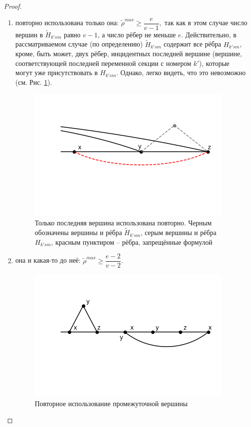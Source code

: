 \begin{proof}
\begin{enumerate}
\begin{enumerate}
\item 
повторно использована только она: $\tilde \rho^{max} \geq \dfrac{e}{v-1},$ 
так как в этом случае число вершин в $\tilde H_{k'sm}$ равно $v-1$, а число рёбер не меньше $e$. Действительно, в рассматриваемом случае (по определению) $\tilde H_{k'sm}$ содержит все рёбра $H_{k'sm}$, кроме, быть может, двух рёбер, инцидентных последней вершине (вершине, соответствующей последней переменной секции с номером $k'$), которые могут уже присутствовать в $H_{k'sm}$.
Однако, легко видеть, что это невозможно (см. Рис. \ref{fig:only last reused}).
\begin{figure}
  \centering
  \includegraphics[scale=0.5]{picrel/only_last_reused.png}
  \caption{Только последняя вершина использована повторно. Черным обозначены вершины и рёбра $\tilde H_{k'sm}$, серым вершины и рёбра  $H_{k'sm}$, красным пунктиром -- рёбра, запрещённые формулой  }
  \label{fig:only last reused}
\end{figure}
\item
она и какая-то до неё: $\tilde \rho^{max} \geq \dfrac{e-2}{v-2}.$ 
\begin{figure}
  \centering
  \includegraphics[scale=0.5]{picrel/reuse_intermediate.png}
  \caption{Повторное использование промежуточной вершины}

\end{figure}
\end{enumerate}
\end{enumerate}
\end{proof}
